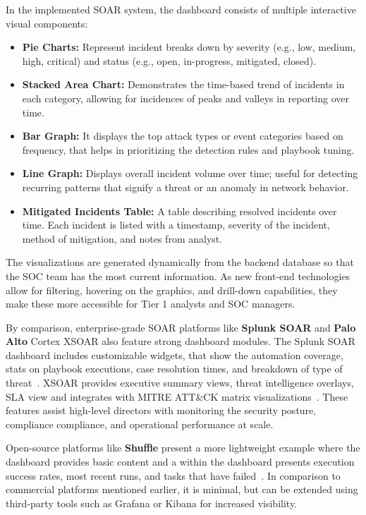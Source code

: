 In the implemented SOAR system, the dashboard consists of multiple interactive visual components:

\begin{itemize}[noitemsep,topsep=0pt]
    \item \textbf{Pie Charts:} Represent incident breaks down by severity (e.g., low, medium, high, critical) and status (e.g., open, in-progress, mitigated, closed). 
    \item \textbf{Stacked Area Chart:} Demonstrates the time-based trend of incidents in each category, allowing for incidences of peaks and valleys in reporting over time. 
    \item \textbf{Bar Graph:} It displays the top attack types or event categories based on frequency, that helps in prioritizing the detection rules and playbook tuning.
    \item \textbf{Line Graph:} Displays overall incident volume over time; useful for detecting recurring patterns that signify a threat or an anomaly in network behavior.
    \item \textbf{Mitigated Incidents Table:} A table describing resolved incidents over time.  Each incident is listed with a timestamp, severity of the incident, method of mitigation, and notes from analyst.
\end{itemize}

The visualizations are generated dynamically from the backend database so that the SOC team has the most current information. As new front-end technologies allow for filtering, hovering on the graphics, and drill-down capabilities, they make these more accessible for Tier 1 analysts and SOC managers.

By comparison, enterprise-grade SOAR platforms like \textbf{Splunk SOAR} and \textbf{Palo Alto} Cortex XSOAR also feature strong dashboard modules. The Splunk SOAR dashboard includes customizable widgets, that show the automation coverage, stats on playbook executions, case resolution times, and breakdown of type of threat~\cite{splunk}. XSOAR provides executive summary views, threat intelligence overlays, SLA view and integrates with MITRE ATT\&CK matrix visualizations~\cite{paloalto}. These features assist high-level directors with monitoring the security posture, compliance compliance, and operational performance at scale.

Open-source platforms like \textbf{Shuffle} present a more lightweight example where the dashboard provides basic content and a within the dashboard presents execution success rates, most recent runs, and tasks that have failed~\cite{techtarget}. In comparison to commercial platforms mentioned earlier, it is minimal, but can be extended using third-party tools such as Grafana or Kibana for increased visibility.

